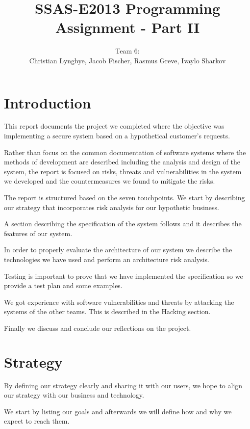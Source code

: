 \documentclass[a4paper]{article}
\title{SSAS-E2013 Programming Assignment - Part II}
\author{Team 6:\\Christian Lyngbye, Jacob Fischer, Rasmus Greve, Ivaylo Sharkov}
\begin{document}
\maketitle

\tableofcontents

\newpage
\section{Introduction}
This report documents the project we completed where the objective was implementing a secure system based on a hypothetical customer's requests.

Rather than focus on the common documentation of software systems where the methods of development are described including the analysis and design of the system, the report is focused on risks, threats and vulnerabilities in the system we developed and the countermeasures we found to mitigate the risks.

The report is structured based on the seven touchpoints\cite{McGraw2006}. We start by describing our strategy that incorporates risk analysis for our hypothetic business.

A section describing the specification of the system follows and it describes the features of our system. 

In order to properly evaluate the architecture of our system we describe the technologies we have used and perform an architecture risk analysis.

Testing is important to prove that we have implemented the specification so we provide a test plan and some examples.

We got experience with software vulnerabilities and threats by attacking the systems of the other teams. This is described in the Hacking section.

Finally we discuss and conclude our reflections on the project.




\section{Strategy}
By defining our strategy clearly and sharing it with our users, we hope to align our strategy with our business and technology.

We start by listing our goals and afterwards we will define how and why we expect to reach them.
\end{document}
